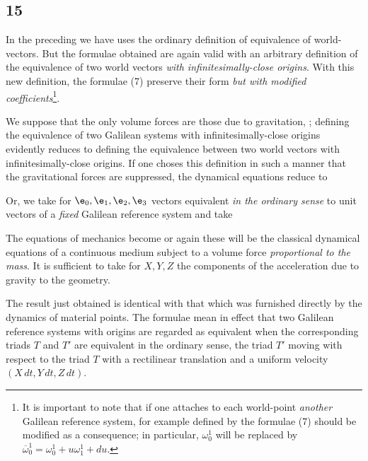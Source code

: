 \subsection*{15}
In the preceding we have uses the ordinary definition of equivalence of world-vectors. But the formulae obtained are again valid with an arbitrary definition of the equivalence of two world vectors \textit{with infinitesimally-close origins}. With this new definition, the formulae (7) preserve their form \textit{but with modified coefficients}\footnote{It is important to note that if one attaches to each world-point \textit{another} Galilean reference system, for example defined by
the formulae (7) should be modified as a consequence; in particular, $\omega^1_0$ will be replaced by $\overline{\omega}^1_0 = \omega^1_0 + u\omega^1_1 + du$.}.

We suppose that the only volume forces are those due to gravitation, ; defining the equivalence of two Galilean systems with infinitesimally-close origins evidently reduces to defining the equivalence between two world vectors with infinitesimally-close origins. If one choses this definition in such a manner that the gravitational forces are suppressed, the dynamical equations reduce to

Or, we take for $\e_0,\e_1,\e_2,\e_3$ vectors equivalent \textit{in the ordinary sense} to unit vectors of a \textit{fixed} Galilean reference system and take

The equations of mechanics become
or again
these will be the classical dynamical equations of a continuous medium subject to a volume force \textit{proportional to the mass}. It is sufficient to take for $X,Y,Z$ the components of the acceleration due to gravity to  the geometry.

The result just obtained is identical with that which was furnished directly by the dynamics of material points. The formulae
mean in effect that two Galilean reference systems with origins
are regarded as equivalent when the corresponding triads $T$ and $T'$ are equivalent in the ordinary sense, the triad $T'$ moving with respect to the triad $T$ with a rectilinear translation and a uniform velocity $(X\,dt, Y\,dt, Z\,dt)$.


